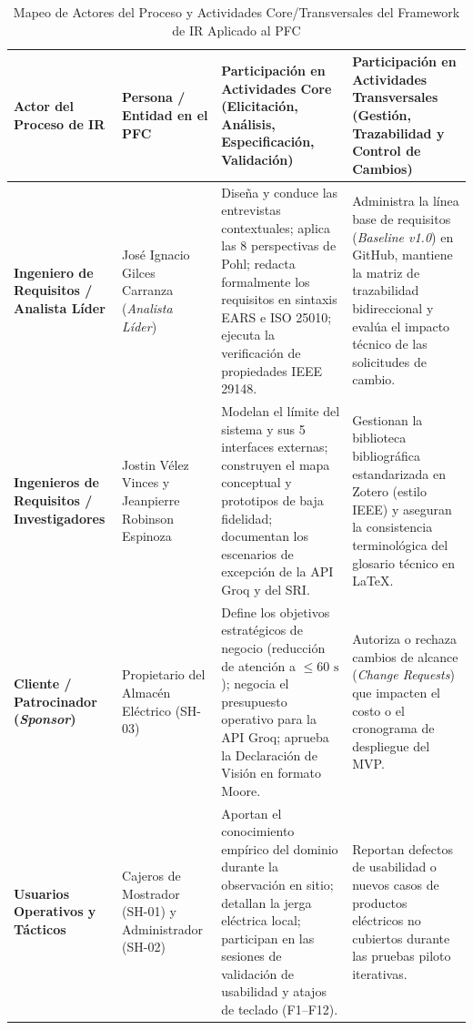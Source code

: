 \begin{table}[htbp]
\centering
\scriptsize
\caption{Mapeo de Actores del Proceso y Actividades Core/Transversales del Framework de IR Aplicado al PFC \cite{ieee29148, pohl2025}}
\label{tab:actores_framework}
\begin{tabularx}{\textwidth}{l l Y Y}
\toprule
\textbf{Actor del Proceso de IR} & \textbf{Persona / Entidad en el PFC} & \textbf{Participación en Actividades Core (Elicitación, Análisis, Especificación, Validación)} & \textbf{Participación en Actividades Transversales (Gestión, Trazabilidad y Control de Cambios)} \\
\midrule
\textbf{Ingeniero de Requisitos / Analista Líder} & José Ignacio Gilces Carranza (\textit{Analista Líder}) & Diseña y conduce las entrevistas contextuales; aplica las 8 perspectivas de Pohl; redacta formalmente los requisitos en sintaxis EARS e ISO 25010; ejecuta la verificación de propiedades IEEE 29148. & Administra la línea base de requisitos (\textit{Baseline v1.0}) en GitHub, mantiene la matriz de trazabilidad bidireccional y evalúa el impacto técnico de las solicitudes de cambio. \\
\midrule
\textbf{Ingenieros de Requisitos / Investigadores} & Jostin Vélez Vinces y Jeanpierre Robinson Espinoza & Modelan el límite del sistema y sus 5 interfaces externas; construyen el mapa conceptual y prototipos de baja fidelidad; documentan los escenarios de excepción de la API Groq y del SRI. & Gestionan la biblioteca bibliográfica estandarizada en Zotero (estilo IEEE) y aseguran la consistencia terminológica del glosario técnico en LaTeX. \\
\midrule
\textbf{Cliente / Patrocinador (\textit{Sponsor})} & Propietario del Almacén Eléctrico (SH-03) & Define los objetivos estratégicos de negocio (reducción de atención a $\le 60\text{ s}$); negocia el presupuesto operativo para la API Groq; aprueba la Declaración de Visión en formato Moore. & Autoriza o rechaza cambios de alcance (\textit{Change Requests}) que impacten el costo o el cronograma de despliegue del MVP. \\
\midrule
\textbf{Usuarios Operativos y Tácticos} & Cajeros de Mostrador (SH-01) y Administrador (SH-02) & Aportan el conocimiento empírico del dominio durante la observación en sitio; detallan la jerga eléctrica local; participan en las sesiones de validación de usabilidad y atajos de teclado (F1--F12). & Reportan defectos de usabilidad o nuevos casos de productos eléctricos no cubiertos durante las pruebas piloto iterativas. \\

\end{tabularx}
\end{table}

